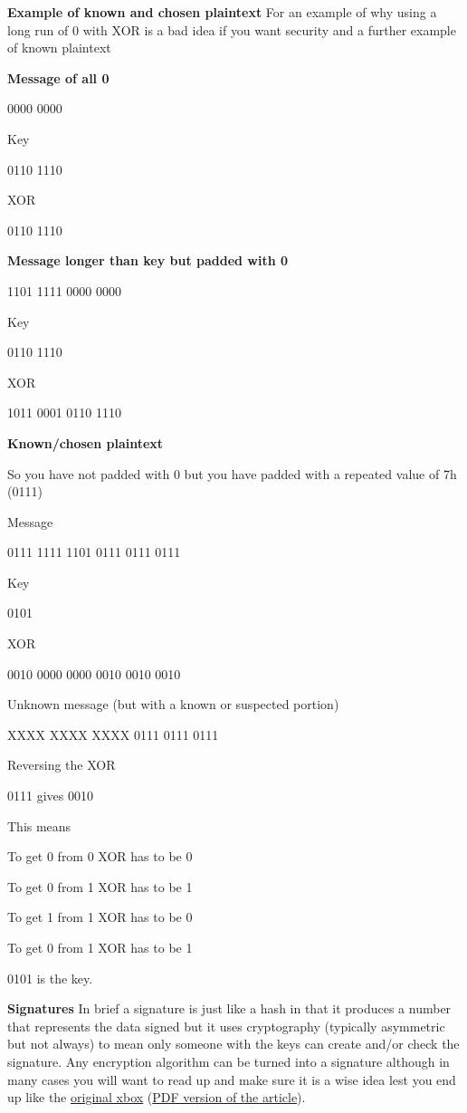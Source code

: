 \documentclass[
]{book}
\begin{document}
\textbf{Example of known and chosen plaintext} For an example of why using a long run of 0 with XOR is a bad idea if you want security and a further example of known plaintext

\textbf{Message of all 0}

0000 0000

Key

0110 1110

XOR

0110 1110

\textbf{Message longer than key but padded with 0}

1101 1111 0000 0000

Key

0110 1110

XOR

1011 0001 0110 1110

\textbf{Known/chosen plaintext}

So you have not padded with 0 but you have padded with a repeated value of 7h (0111)

Message

0111 1111 1101 0111 0111 0111

Key

0101

XOR

0010 0000 0000 0010 0010 0010

Unknown message (but with a known or suspected portion)

XXXX XXXX XXXX 0111 0111 0111

Reversing the XOR

0111 gives 0010

This means

To get 0 from 0 XOR has to be 0

To get 0 from 1 XOR has to be 1

To get 1 from 1 XOR has to be 0

To get 0 from 1 XOR has to be 1

0101 is the key.

\textbf{Signatures} In brief a signature is just like a hash in that it produces a number that represents the data signed but it uses cryptography (typically asymmetric but not always) to mean only someone with the keys can create and/or check the signature. Any encryption algorithm can be turned into a signature although in many cases you will want to read up and make sure it is a wise idea lest you end up like the \href{http://web.archive.org/web/20090212084156/http://xbox-linux.org/wiki/17_Mistakes_Microsoft_Made_in_the_Xbox_Security_System}{original xbox} (\href{http://events.ccc.de/congress/2005/fahrplan/attachments/591-paper_xbox.pdf}{PDF version of the article}).
\end{document}
